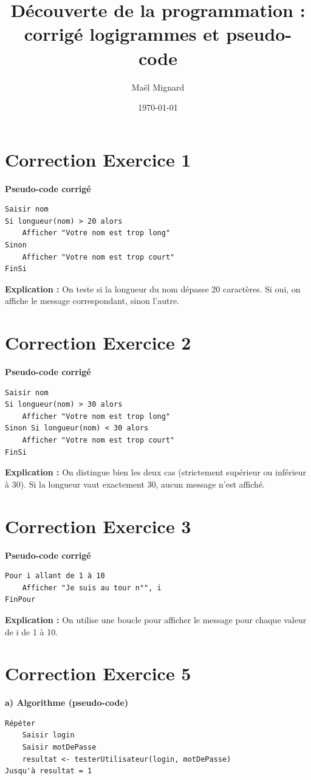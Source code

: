 \documentclass[12pt,a4paper]{article}
\title{Découverte de la programmation : corrigé logigrammes et pseudo-code}
\author{Maël Mignard}
\date{\today}
\begin{document}
\maketitle

\section*{Correction Exercice 1}
\textbf{Pseudo-code corrigé}
\begin{verbatim}
Saisir nom
Si longueur(nom) > 20 alors
    Afficher "Votre nom est trop long"
Sinon
    Afficher "Votre nom est trop court"
FinSi
\end{verbatim}
\textbf{Explication :} On teste si la longueur du nom dépasse 20 caractères. Si oui, on affiche le message correspondant, sinon l'autre.

\section*{Correction Exercice 2}
\textbf{Pseudo-code corrigé}
\begin{verbatim}
Saisir nom
Si longueur(nom) > 30 alors
    Afficher "Votre nom est trop long"
Sinon Si longueur(nom) < 30 alors
    Afficher "Votre nom est trop court"
FinSi
\end{verbatim}
\textbf{Explication :} On distingue bien les deux cas (strictement supérieur ou inférieur à 30). Si la longueur vaut exactement 30, aucun message n'est affiché.

\section*{Correction Exercice 3}
\textbf{Pseudo-code corrigé}
\begin{verbatim}
Pour i allant de 1 à 10
    Afficher "Je suis au tour n°", i
FinPour
\end{verbatim}
\textbf{Explication :} On utilise une boucle pour afficher le message pour chaque valeur de i de 1 à 10.

\section*{Correction Exercice 5}
\textbf{a) Algorithme (pseudo-code)}
\begin{verbatim}
Répéter
    Saisir login
    Saisir motDePasse
    resultat <- testerUtilisateur(login, motDePasse)
Jusqu'à resultat = 1
\end{verbatim}
\end{document}
